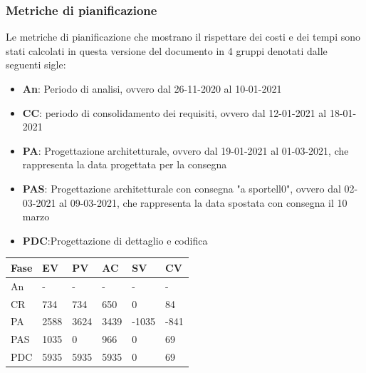 \subsubsection{Metriche di pianificazione}
    Le metriche di pianificazione che mostrano il rispettare dei costi e dei tempi sono stati calcolati in questa versione del documento in 4 gruppi denotati dalle seguenti sigle:
    \begin{itemize}
        \item \textbf{An}: Periodo di analisi, ovvero dal 26-11-2020 al 10-01-2021
        \item \textbf{CC}: periodo di consolidamento dei requisiti, ovvero dal 12-01-2021 al 18-01-2021
        \item \textbf{PA}: Progettazione architetturale, ovvero dal 19-01-2021 al 01-03-2021, che rappresenta la data progettata per la consegna
        \item \textbf{PAS}: Progettazione architetturale con consegna "a sportell0", ovvero dal 02-03-2021 al 09-03-2021, che rappresenta la data spostata con consegna il 10 marzo
        \item \textbf{PDC}:Progettazione di dettaglio e codifica
    \end{itemize}
    
    
    \begin{longtabu} to \textwidth {| X[0.1,c m] | X[0.1,c m]| X[0.1,c m]| X[0.1,c m]| X[0.1,c m]| X[0.1,c m] |}
        \hline
        \textbf{Fase} &
        \textbf{EV} &
        \textbf{PV} &
        \textbf{AC} &
        \textbf{SV} &
        \textbf{CV} \\
        \hline
        An & - & - & - & - & -  \\ 
        \hline
        CR & 734 & 734 & 650 & 0 & 84 \\
        \hline
        PA & 2588 & 3624 & 3439 & -1035 & -841\\
        \hline
        PAS & 1035 & 0 & 966 & 0 & 69 \\
        \hline
        PDC & 5935 & 5935 & 5935 & 0 & 69 \\
        \hline 
        \end{longtabu}


